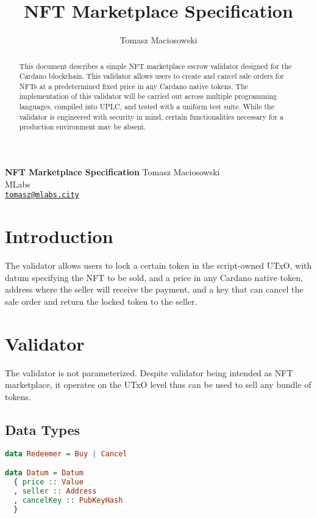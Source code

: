 \documentclass{article}
\title{NFT Marketplace Specification}
\author{Tomasz Maciosowski}
\date{}
\begin{document}
\begin{center}
  \vskip 10mm {\LARGE\bf
      NFT Marketplace Specification
    }
  \vskip 10mm
  Tomasz Maciosowski \\
  MLabs\\
  \href{mailto:tomasz@mlabs.city}{\tt tomasz@mlabs.city} \\
\end{center}

\vskip 5mm

\begin{abstract}
  This document describes a simple NFT marketplace escrow validator designed for the Cardano blockchain.
  This validator allows users to create and cancel sale orders for NFTs at a predetermined fixed price in any Cardano native tokens.
  The implementation of this validator will be carried out across multiple programming languages, compiled into UPLC, and tested with a uniform test suite.
  While the validator is engineered with security in mind, certain functionalities necessary for a production environment may be absent.
\end{abstract}

\section{Introduction}

The validator allows users to lock a certain token in the script-owned UTxO, with datum specifying the NFT to be sold, and a price in any Cardano native token, address where the seller will receive the payment, and a key that can cancel the sale order and return the locked token to the seller.

\section{Validator}

The validator is not parameterized. Despite validator being intended as NFT marketplace, it operates on the UTxO level thus can be used to sell any bundle of tokens.

\subsection{Data Types}
\begin{lstlisting}[language=Haskell]
data Redeemer = Buy | Cancel

data Datum = Datum
  { price :: Value
  , seller :: Address
  , cancelKey :: PubKeyHash
  }
\end{lstlisting}
\end{document}
